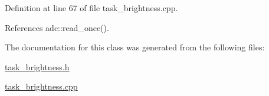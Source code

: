 Definition at line 67 of file task\_\-brightness.cpp.

References adc::read\_\-once().

The documentation for this class was generated from the following files:\begin{DoxyCompactItemize}
\item 
\hyperlink{task__brightness_8h}{task\_\-brightness.h}\item 
\hyperlink{task__brightness_8cpp}{task\_\-brightness.cpp}\end{DoxyCompactItemize}
